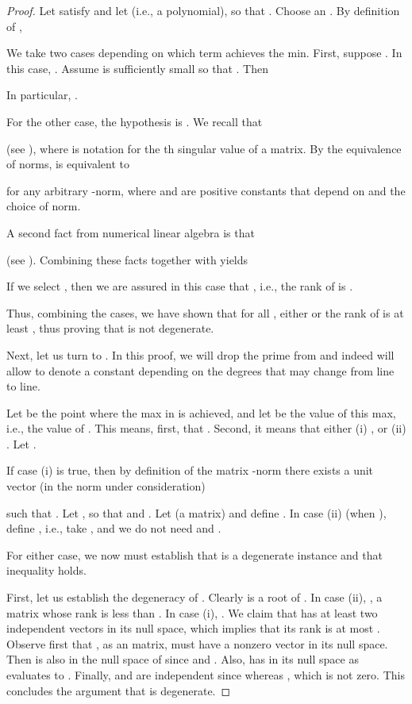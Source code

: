 \documentclass{article}
\newcommand\eref[1]{}
\begin{document}
\begin{proof}
Let  satisfy \eref{eq:hatfminusf1} and
let  (i.e., a polynomial), so that
.
Choose an
.  By definition of ,

We take two cases depending on which term achieves the min.
First, suppose .  In this case,
. 
 Assume  is sufficiently small so that .
Then

In particular, .

For the other case, the hypothesis is
.
We recall that 

(see \cite[(2.3.11) and \S5.5.4]{gvl}),
where  is notation for the th
singular value of a matrix.  By the equivalence of norms, \eref{eq:fromgvl} is equivalent to

for any arbitrary -norm, where  and  are positive constants that depend on  and the choice of norm.



A second fact from numerical linear algebra is that

(see \cite[(2.3.11) and Cor.~8.6.2]{gvl}).  
Combining these facts together with \eref{eq:ebound} yields

If we select , then we are assured in this case
that , i.e., the rank of  is
.

Thus, combining the cases, we have shown that for all , 
either
 or the rank of  is at least , 
thus proving that  is not degenerate.

Next, let us turn to \eref{eq:hatfminusf2}.   
In this proof, we will drop the prime from 
  and indeed will allow  to denote a constant
depending on the degrees that may change from line to line.


Let  be the point where the max in \eref{cond_def} is
achieved, and let  be the value of this max, i.e., the
value of . This means, first, that
.  Second, it
means that either (i)
,  or (ii) .
Let . 

If case (i) is true, then by definition of the matrix
-norm there exists a unit vector (in the norm under consideration) 

such that .  Let ,
so that  and .  
Let  (a 
matrix) and define .  
In case (ii) (when ), define
, i.e., take , and we do not need
 and .

For either case,
we now must establish that  is a degenerate instance
and that inequality \eref{eq:hatfminusf2} holds.

First, let us establish the degeneracy of .  Clearly 
is a root of .  In case (ii), , a matrix
whose rank is less than .
In case (i),
.
We claim that  has at least two independent vectors in its null space,
which implies that its rank is at most .  Observe first that , as 
an  matrix, must have a nonzero vector  in its null space.
Then  is also in the null space of  since 
and .  Also,  has  in
its null space as  evaluates to .  Finally,  and
 are independent since  whereas , which
is not zero.  This concludes the argument that  is
degenerate.  


\end{proof}
\end{document}
